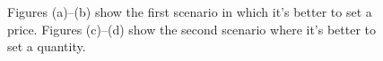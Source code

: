 \documentclass[12pt, final]{article}
\begin{document}
\begin{figure}[ht]
\centering
{}

\caption{Figures (a)--(b) show the first scenario in which it's better to set a price.  Figures (c)--(d) show the second scenario where it's better to set a quantity.}
\label{fig:one}
\end{figure}
\end{document}
